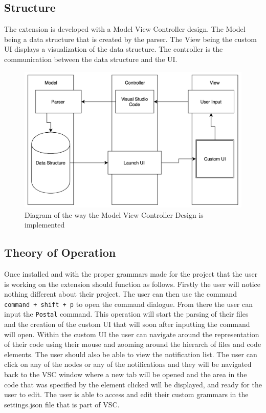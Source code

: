 \documentclass[letterpaper,10pt,titlepage,draftclsnofoot,onecolumn,onesided] {IEEEtran}
\begin{document}
\subsection{Structure}

The extension is developed with a Model View Controller design.
The Model being a data structure that is created by the parser. 
The View being the custom UI displays a visualization of the data structure.
The controller is the communication between the data structure and the UI.

\begin{figure}[h]
	\centering
	\includegraphics[width=.75\textwidth]{MVCsimple}
	\caption{Diagram of the way the Model View Controller Design is implemented}
\end{figure}

\subsection{Theory of Operation}

Once installed and with the proper grammars made for the project that the user is working on the extension should function as follows. 
Firstly the user will notice nothing different about their project. 
The user can then use the command \texttt{command + shift + p} to open the command dialogue.
From there the user can input the \texttt{Postal} command. 
This operation will start the parsing of their files and the creation of the custom UI that will soon after inputting the command will open. 
Within the custom UI the user can navigate around the representation of their code using their mouse and zooming around the hierarch of files and code elements.
The user should also be able to view the notification list. 
The user can click on any of the nodes or any of the notifications and they will be navigated back to the VSC window where a new tab will be opened and the area in the code that was specified by the element clicked will be displayed, and ready for the user to edit.
The user is able to access and edit their custom grammars in the settings.json file that is part of VSC. 
\end{document}

